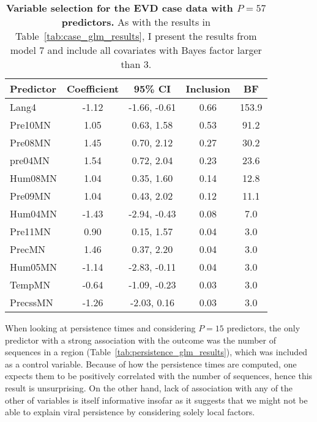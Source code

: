 \begin{minipage}{\textwidth}    
\setcounter{mpfootnote}{\value{footnote}}
\renewcommand{\thempfootnote}{\arabic{mpfootnote}}
\fontsize{9}{11}\selectfont
{}
\begin{longtable}{lcccc}
\caption[Variable selection for the EVD case data with $P = 57$ predictors.]{\textbf{Variable selection for the EVD case data with $P = 57$ predictors.}
As with the results in Table~\ref{tab:case_glm_results}, I present the results from model 7 and include all covariates with Bayes factor larger than 3.} 
\label{tab:case_bigP_results}\\
\toprule
Predictor\footnotemark[1] & Coefficient\footnotemark[2] & 95\% CI\footnotemark[3] & Inclusion\footnotemark[4] & BF\footnotemark[5] \\
\toprule
Lang4 & -1.12 & -1.66, -0.61 & 0.66 & 153.9 \\
\hline
Pre10MN & 1.05 & 0.63, 1.58 & 0.53 & 91.2 \\
\hline
Pre08MN & 1.45 & 0.70, 2.12 & 0.27 & 30.2 \\
\hline
pre04MN & 1.54 & 0.72, 2.04 & 0.23 & 23.6 \\
\hline
Hum08MN & 1.04 & 0.35, 1.60 & 0.14 & 12.8 \\
\hline
Pre09MN & 1.04 & 0.43, 2.02 & 0.12 & 11.1 \\
\hline
Hum04MN & -1.43 & -2.94, -0.43 & 0.08 & 7.0 \\
\hline
Pre11MN & 0.90 & 0.15, 1.57 & 0.04 & 3.0 \\
\hline
PrecMN & 1.46 & 0.37, 2.20 & 0.04 & 3.0 \\
\hline
Hum05MN & -1.14 & -2.83, -0.11 & 0.04 & 3.0 \\
\hline
TempMN & -0.64 & -1.09, -0.23 & 0.03 & 3.0 \\
\hline
PrecssMN & -1.26 & -2.03, 0.16 & 0.03 & 3.0 \\
\bottomrule
\end{longtable}
\setcounter{footnote}{\value{mpfootnote}}
\end{minipage}

When looking at persistence times and considering $P = 15$ predictors, the only predictor with a strong association with the outcome was the number of sequences in a region (Table~\ref{tab:persistence_glm_results}), which was included as a control variable.
Because of how the persistence times are computed, one expects them to be positively correlated with the number of sequences, hence this result is unsurprising.
On the other hand, lack of association with any of the other of variables is itself informative insofar as it suggests that we might not be  able to explain viral persistence by considering solely local factors.

